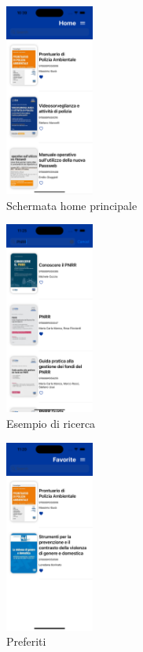 \begin{multicols}{3}
    \begin{figure}[H]
        \centering
        \includegraphics[width=0.26\textwidth]{img/Simulator Screen Shot - iPhone 14 Pro - 2022-10-05 at 10.39.58.png}
        \caption{Schermata home principale}
        \label{home-ios}
    \end{figure}
    
    \begin{figure}[H]
        \centering
        \includegraphics[width=0.26\textwidth]{img/Simulator Screen Shot - iPhone 14 Pro - 2022-10-05 at 11.25.21.png}
        \caption{Esempio di ricerca}
        \label{ricerca-ios}
    \end{figure}

    \begin{figure}[H]
        \centering
        \includegraphics[width=0.26\textwidth]{img/Simulator Screen Shot - iPhone 14 Pro - 2022-10-05 at 11.20.04.png}
        \caption{Preferiti}
        \label{preferiti-ios}
    \end{figure}


\end{multicols}
